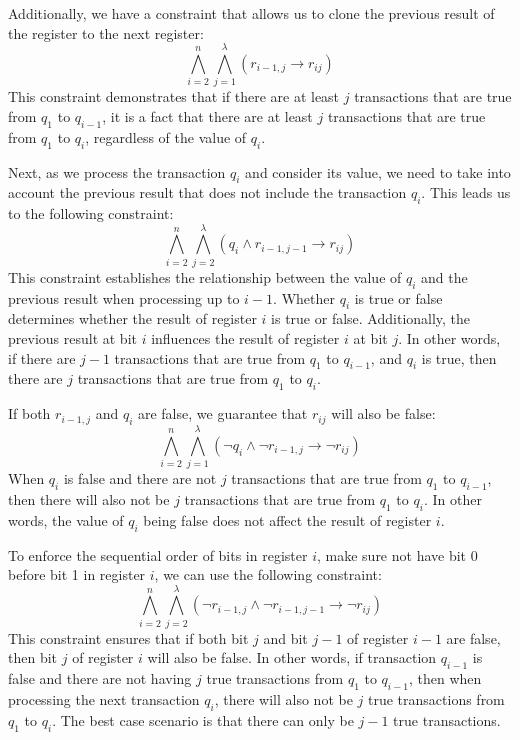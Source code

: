 Additionally, we have a constraint that allows us to clone the previous result of the register to the next register:
\begin{equation}
    \bigwedge_{i=2}^{n} \bigwedge_{j=1}^{\lambda} \left( r_{i-1,j} \rightarrow r_{ij} \right)
\end{equation}
This constraint demonstrates that if there are at least $j$ transactions that are true from $q_1$ to $q_{i-1}$,
it is a fact that there are at least $j$ transactions that are true from $q_1$ to $q_i$, regardless of the value of $q_i$.

Next, as we process the transaction $q_i$ and consider its value, we need to take into account the previous result that does not include the transaction $q_i$.
This leads us to the following constraint:
\begin{equation}
    \bigwedge_{i=2}^{n} \bigwedge_{j=2}^{\lambda} \left( q_{i} \wedge r_{i-1,j-1} \rightarrow r_{ij} \right)
\end{equation}
This constraint establishes the relationship between the value of $q_i$ and the previous result
when processing up to $i-1$.
Whether $q_i$ is true or false determines whether the result of register $i$
is true or false.
Additionally, the previous result at bit $i$ influences the result of register $i$ at bit $j$.
In other words, if there are $j-1$ transactions that are true from $q_1$ to $q_{i-1}$,
and $q_i$ is true, then there are $j$ transactions that are true from $q_1$ to $q_i$.

If both $r_{i-1,j}$ and $q_i$ are false, we guarantee that $r_{ij}$ will also be false:
\begin{equation}
    \bigwedge_{i=2}^{n} \bigwedge_{j=1}^{\lambda} \left( \neg q_{i} \wedge \neg r_{i-1,j} \rightarrow \neg r_{ij} \right)
\end{equation}
When $q_i$ is false and there are not $j$ transactions that are true from $q_1$ to $q_{i-1}$,
then there will also not be $j$ transactions that are true from $q_1$ to $q_i$.
In other words, the value of $q_i$ being false does not affect the result of register $i$.

To enforce the sequential order of bits in register $i$, make sure not have bit 0 before bit 1 in register $i$, we can use the following constraint:
\begin{equation}
    \bigwedge_{i=2}^{n} \bigwedge_{j=2}^{\lambda} \left( \neg r_{i-1,j} \wedge \neg r_{i-1,j-1} \rightarrow \neg r_{ij} \right)
\end{equation}
This constraint ensures that if both bit $j$ and bit $j-1$ of register $i-1$ are false,
then bit $j$ of register $i$ will also be false.
In other words, if transaction $q_{i-1}$ is false and there are not having $j$ true transactions from $q_1$ to $q_{i-1}$,
then when processing the next transaction $q_i$, there will also not be $j$ true transactions from $q_1$ to $q_i$.
The best case scenario is that there can only be $j-1$ true transactions.

